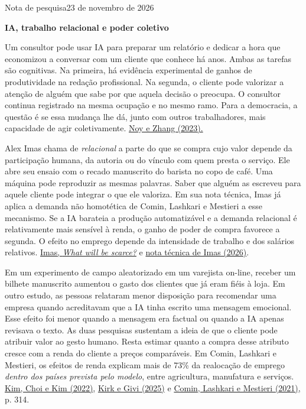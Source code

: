 \documentclass[11pt,a4paper]{article}
\newcommand{\subtitulo}[1]{\par\smallskip{\large\bfseries\color{azul}#1\par}\nobreak}
\newcommand{\clm}{\href{https://dcomin.host.dartmouth.edu/Publications_files/ECTA16317.pdf}{Comin, Lashkari e Mestieri (2021)}}
\newcommand{\imasensaio}{\href{https://aleximas.substack.com/p/what-will-be-scarce}{Imas, \emph{What will be scarce?}}}
\newcommand{\imasnota}{\href{https://static1.squarespace.com/static/57967bc7cd0f68048126361d/t/69dbbeb4bd54b97b00d8dec3/1776008884067/Technical\%2BNote\%2BStructural\%2BChange.pdf}{nota técnica de Imas (2026)}}
\begin{document}
\thispagestyle{primeira}
{\small\sffamily\color{azul}Nota de pesquisa\hfill 23 de novembro de 2026\par}
\vspace{5pt}
{\LARGE\bfseries\color{tinta}IA, trabalho relacional e poder coletivo\par}
\vspace{5pt}

Um consultor pode usar IA para preparar um relatório e dedicar a hora que economizou a conversar com um cliente que conhece há anos. Ambas as tarefas são cognitivas. Na primeira, há evidência experimental de ganhos de produtividade na redação profissional. Na segunda, o cliente pode valorizar a atenção de alguém que sabe por que aquela decisão o preocupa. O consultor continua registrado na mesma ocupação e no mesmo ramo. Para a democracia, a questão é se essa mudança lhe dá, junto com outros trabalhadores, mais capacidade de agir coletivamente. \href{https://doi.org/10.1126/science.adh2586}{Noy e Zhang (2023).}

Alex Imas chama de \emph{relacional} a parte do que se compra cujo valor depende da participação humana, da autoria ou do vínculo com quem presta o serviço. Ele abre seu ensaio com o recado manuscrito do barista no copo de café. Uma máquina pode reproduzir as mesmas palavras. Saber que alguém as escreveu para aquele cliente pode integrar o que ele valoriza. Em sua nota técnica, Imas já aplica a demanda não homotética de Comin, Lashkari e Mestieri a esse mecanismo. Se a IA barateia a produção automatizável e a demanda relacional é relativamente mais sensível à renda, o ganho de poder de compra favorece a segunda. O efeito no emprego depende da intensidade de trabalho e dos salários relativos. \imasensaio{} e \imasnota.

\subtitulo{Quanto vale saber que alguém escreveu para mim?}
Em um experimento de campo aleatorizado em um varejista on-line, receber um bilhete manuscrito aumentou o gasto dos clientes que já eram fiéis à loja. Em outro estudo, as pessoas relataram menor disposição para recomendar uma empresa quando acreditavam que a IA tinha escrito uma mensagem emocional. Esse efeito foi menor quando a mensagem era factual ou quando a IA apenas revisava o texto. As duas pesquisas sustentam a ideia de que o cliente pode atribuir valor ao gesto humano. Resta estimar quanto a compra desse atributo cresce com a renda do cliente a preços comparáveis. Em Comin, Lashkari e Mestieri, os efeitos de renda explicam mais de 73\% da realocação de emprego \emph{dentro dos países prevista pelo modelo}, entre agricultura, manufatura e serviços. \href{https://doi.org/10.1177/10949968221102306}{Kim, Choi e Kim (2022)}, \href{https://doi.org/10.1016/j.jbusres.2024.114984}{Kirk e Givi (2025)} e \clm, p. 314.
\end{document}
